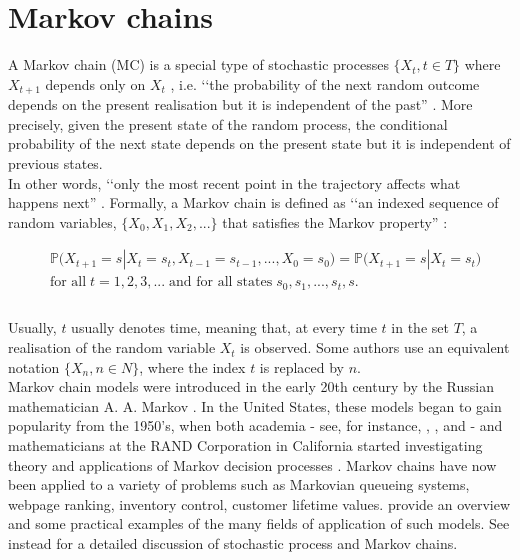 \documentclass[\main/main.tex]{subfiles}
\begin{document}
\section{Markov chains} \label{markov_chain}
A Markov chain (MC) is a special type of stochastic processes  $  \{ X_t, t \in T\}$ where $X_{t+1}$ depends only on $X_{t}$ , i.e. \lq\lq the probability of the next random outcome depends on the present realisation but it is independent of the past'' \citep{Grinstead1997}. 
More precisely, given the present state of the random process, the conditional probability of the next state depends on the present state but it is independent of previous states.\\
In other words, \lq\lq only the most recent point in the trajectory affects what happens next'' \citep{Holmes2015}. Formally, a Markov chain is defined as \lq\lq an indexed sequence of random variables, $\{X_0, X_1, X_2, ...\}$ that satisfies the Markov property'' \citep{Sheskin2010}:

\begin{equation}
\begin{split}
     & \mathds{P} \big(X_{t+1} = s |X_t = s_t, X_{t-1} = s_{t-1}, . . . , X_0 = s_0\big) = 
     \mathds{P} \big(X_{t+1} = s |X_t = s_t\big)\\
    & \text{for all} \; t = 1, 2, 3, ... \; \text{and for all states} \; s_0, s_1, . . . , s_t, s.\\
\end{split}
\end{equation}\\
Usually, $t$ usually denotes time, meaning that, at every time $t$ in the set $T$, a realisation of the random variable $X_t$ is observed.
Some authors use an equivalent notation $\{X_n, n \in N\}$, where the index $t$ is replaced by $n$.\\


Markov chain models were introduced in the early 20th century by the Russian mathematician A. A. Markov \citep{Hayes2013}. In the United States, these models began to gain popularity from the 1950's, when both academia - see, for instance, \cite{Feller1950}, \cite{Howard1960}, and \cite{Kemeny1960} - and mathematicians at the RAND Corporation in California started investigating theory and applications of Markov decision processes \citep{Sheskin2010}. Markov chains have now been applied to a variety of problems such as Markovian queueing systems, webpage ranking, inventory control, customer lifetime values. \cite{Ching2006} provide an overview and some practical examples of the many fields of application of such models.
See instead \cite{Karlin1975} for a detailed discussion of stochastic process and Markov chains. \\
\end{document}
